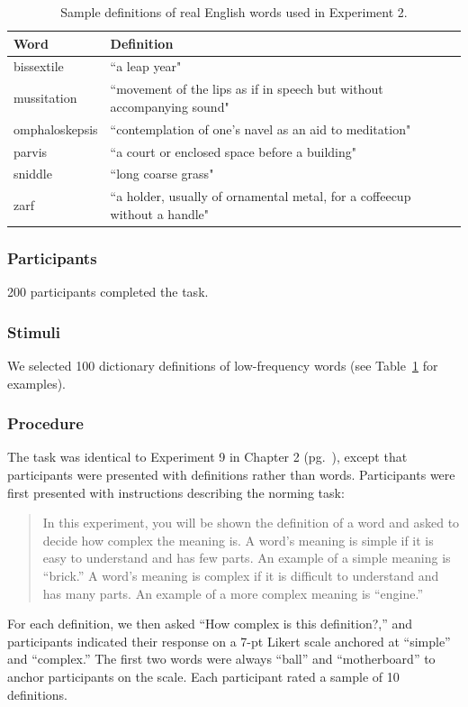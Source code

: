 \begin{table}[t!]
\centering

\begin{tabular}{ll}
\toprule
\textbf{Word} & \textbf{Definition}                \\
\toprule
   bissextile & ``a leap year"\\
   mussitation  &  \multicolumn{1}{p{12cm}}{ ``movement of the lips as if in speech but without accompanying sound"}    \\
   omphaloskepsis  &  \multicolumn{1}{p{12cm}}{ ``contemplation of one's navel as an aid to meditation"}                  \\
   parvis    &  \multicolumn{1}{p{12cm}}{ ``a court or enclosed space before a building"}                               \\
   sniddle      &  \multicolumn{1}{p{12cm}}{ ``long coarse grass"}     \\
   zarf     & \multicolumn{1}{p{12cm}}{ ``a holder, usually of ornamental metal, for a coffeecup without a handle"}                                 \\

 \bottomrule
\end{tabular}
\caption{Sample definitions of real English words used in Experiment 2.}
\label{tab:sample_word_defs}
\end{table}
\subsubsection{Participants}
200 participants completed the task.
\subsubsection{Stimuli}
We selected 100 dictionary definitions of low-frequency words (see Table~\ref{tab:sample_word_defs} for examples). 
\subsubsection{Procedure}
The task was identical to Experiment 9 in Chapter 2 (pg.\ \pageref{ch2-9}), except that participants were presented with definitions rather than words. Participants were first presented with instructions describing the norming task:
\begin{quote}
In this experiment, you will be shown the definition of a word and asked to decide how complex the meaning is. A word's meaning is simple if it is easy to understand and has few parts. An example of a simple meaning is ``brick.'' A word's meaning is complex if it is difficult to understand and has many parts. An example of a more complex meaning is ``engine.''
\end{quote}
For each definition, we then asked ``How complex is this definition?,'' and participants indicated their response on a 7-pt Likert scale anchored at ``simple'' and ``complex.'' The first two words were always ``ball'' and ``motherboard'' to anchor participants on the scale. Each participant rated a sample of 10 definitions. 

